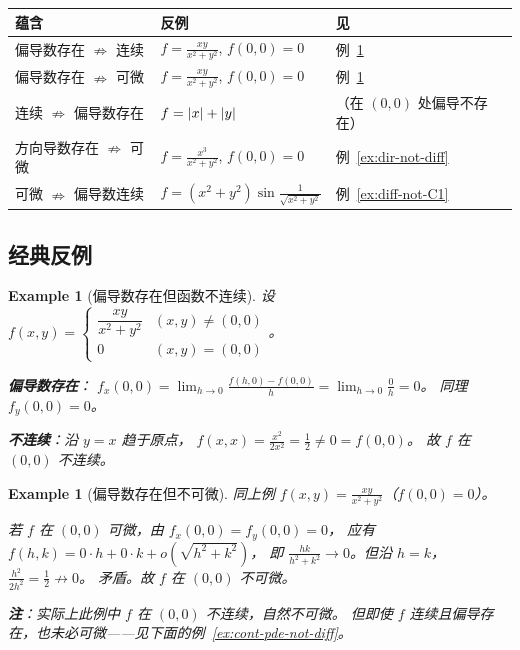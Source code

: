 \documentclass{ctexart}
\newtheorem{example}[theorem]{Example}
\begin{document}
\begin{center}
\renewcommand{\arraystretch}{1.4}
\begin{tabular}{lll}
  \toprule
  \textbf{蕴含} & \textbf{反例} & \textbf{见} \\
  \midrule
  偏导数存在 $\nRightarrow$ 连续
    & $f = \frac{xy}{x^2+y^2}$, $f(0,0)=0$
    & 例~\ref{ex:pde-not-cont} \\
  偏导数存在 $\nRightarrow$ 可微
    & $f = \frac{xy}{x^2+y^2}$, $f(0,0)=0$
    & 例~\ref{ex:pde-not-diff} \\
  连续 $\nRightarrow$ 偏导数存在
    & $f = \left| x \right| + \left| y \right|$
    & （在 $(0,0)$ 处偏导不存在）\\
  方向导数存在 $\nRightarrow$ 可微
    & $f = \frac{x^3}{x^2+y^2}$, $f(0,0)=0$
    & 例~\ref{ex:dir-not-diff} \\
  可微 $\nRightarrow$ 偏导数连续
    & $f = (x^2+y^2)\sin\frac{1}{\sqrt{x^2+y^2}}$
    & 例~\ref{ex:diff-not-C1} \\
  \bottomrule
\end{tabular}
\end{center}

\subsection{经典反例}

\begin{example}[偏导数存在但函数不连续]
  \label{ex:pde-not-cont}
  设
  $f(x,y) = \begin{cases} \dfrac{xy}{x^2+y^2} & (x,y) \ne (0,0) \\ 0 & (x,y) = (0,0) \end{cases}$。

  \textbf{偏导数存在}：
  $f_x(0,0) = \lim_{h \to 0}\frac{f(h,0) - f(0,0)}{h} = \lim_{h \to 0}\frac{0}{h} = 0$。
  同理 $f_y(0,0) = 0$。

  \textbf{不连续}：沿 $y = x$ 趋于原点，
  $f(x,x) = \frac{x^2}{2x^2} = \frac{1}{2} \ne 0 = f(0,0)$。
  故 $f$ 在 $(0,0)$ 不连续。
\end{example}

\begin{example}[偏导数存在但不可微]
  \label{ex:pde-not-diff}
  同上例 $f(x,y) = \frac{xy}{x^2+y^2}$（$f(0,0)=0$）。

  若 $f$ 在 $(0,0)$ 可微，由 $f_x(0,0) = f_y(0,0) = 0$，
  应有 $f(h,k) = 0 \cdot h + 0 \cdot k + o(\sqrt{h^2+k^2})$，
  即 $\frac{hk}{h^2+k^2} \to 0$。但沿 $h = k$，$\frac{h^2}{2h^2} = \frac{1}{2} \not\to 0$。
  矛盾。故 $f$ 在 $(0,0)$ 不可微。

  \textbf{注}：实际上此例中 $f$ 在 $(0,0)$ 不连续，自然不可微。
  但即使 $f$ 连续且偏导存在，也未必可微——见下面的例~\ref{ex:cont-pde-not-diff}。
\end{example}
\end{document}
